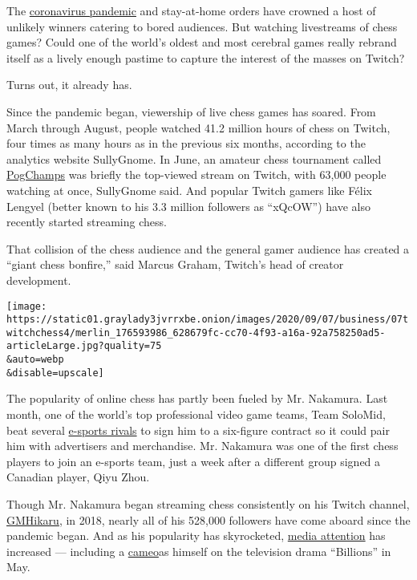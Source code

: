 The
\href{https://www.nytimes3xbfgragh.onion/news-event/coronavirus?name=styln-coronavirus-national\&region=TOP_BANNER\&block=storyline_menu_recirc\&action=click\&pgtype=Interactive\&impression_id=7c47c9f0-eef1-11ea-a988-25121016362c\&variant=undefined}{coronavirus
pandemic} and stay-at-home orders have crowned a host of unlikely
winners catering to bored audiences. But watching livestreams of chess
games? Could one of the world's oldest and most cerebral games really
rebrand itself as a lively enough pastime to capture the interest of the
masses on Twitch?

Turns out, it already has.

Since the pandemic began, viewership of live chess games has soared.
From March through August, people watched 41.2 million hours of chess on
Twitch, four times as many hours as in the previous six months,
according to the analytics website SullyGnome. In June, an amateur chess
tournament called \href{https://www.twitch.tv/chess}{PogChamps} was
briefly the top-viewed stream on Twitch, with 63,000 people watching at
once, SullyGnome said. And popular Twitch gamers like Félix Lengyel
(better known to his 3.3 million followers as ``xQcOW'') have also
recently started streaming chess.

That collision of the chess audience and the general gamer audience has
created a ``giant chess bonfire,'' said Marcus Graham, Twitch's head of
creator development.

\texttt{[image: https://static01.graylady3jvrrxbe.onion/images/2020/09/07/business/07twitchchess4/merlin\_176593986\_628679fc-cc70-4f93-a16a-92a758250ad5-articleLarge.jpg?quality=75\\\&auto=webp\\\&disable=upscale]}

The popularity of online chess has partly been fueled by Mr. Nakamura.
Last month, one of the world's top professional video game teams, Team
SoloMid, beat several
\href{https://www.nytimes3xbfgragh.onion/2014/08/31/technology/esports-explosion-brings-opportunity-riches-for-video-gamers.html}{e-sports
rivals} to sign him to a six-figure contract so it could pair him with
advertisers and merchandise. Mr. Nakamura was one of the first chess
players to join an e-sports team, just a week after a different group
signed a Canadian player, Qiyu Zhou.

Though Mr. Nakamura began streaming chess consistently on his Twitch
channel, \href{https://www.twitch.tv/gmhikaru}{GMHikaru}, in 2018,
nearly all of his 528,000 followers have come aboard since the pandemic
began. And as his popularity has skyrocketed,
\href{https://www.wired.com/story/hikaru-nakamura-twitch-chess/}{media
attention} has increased --- including a
\href{https://www.chess.com/news/view/hikaru-nakamura-billions-showtime}{cameo}as
himself on the television drama ``Billions'' in May.

